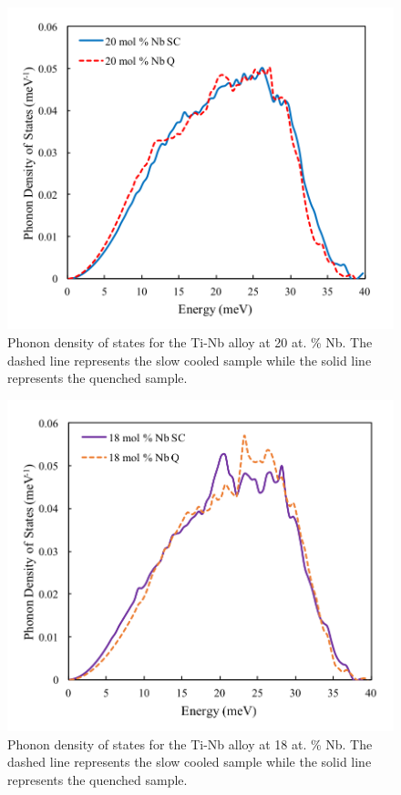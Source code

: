 \pagebreak
\begin{figure}[H]
	\centering
	\includegraphics[width=\textwidth]{Chapter-7/Figures/50dos20.png}
	\caption{Phonon density of states for the Ti-Nb alloy at 20 at. \% Nb. The dashed line represents the slow cooled sample while the solid line represents the quenched sample.}
	\label{Ch7-figure:50dos20}
\end{figure}

\pagebreak
\begin{figure}[H]
	\centering
	\includegraphics[width=\textwidth]{Chapter-7/Figures/50dos18.png}
	\caption{Phonon density of states for the Ti-Nb alloy at 18 at. \% Nb. The dashed line represents the slow cooled sample while the solid line represents the quenched sample.}
	\label{Ch7-figure:50dos18}
\end{figure}

